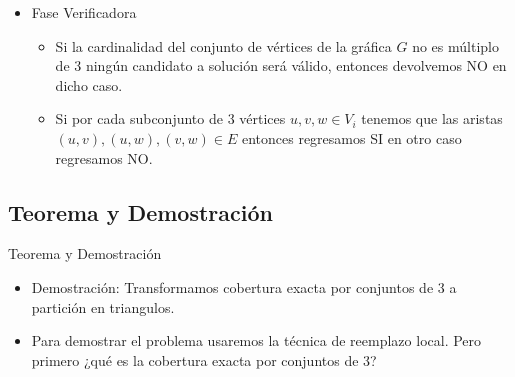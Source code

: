 \begin{frame}{\subsectiontitle}
    \begin{itemize}
    \itemj Fase Adivinadora\\
    \begin{itemize}
        \item Sabemos que $|V| = 3q$ entonces supongamos que tenemos un dado equilibrado de $q$ lados. Para cada $v\in V$ tiramos nuestro dado, sea $n$ el número obtenido por el dado, si el subconjunto de vértices $V_n$ tiene menos de 3 vértices entonces agregamos el vértice $v$ a $V_n$, si el subconjunto de vértices $V_n$ ya tiene 3 vértices entonces buscamos el siguiente $V_m$ que tenga menos de 3 vértices y agregamos $v$ a $V_m$, si llegamos a $V_q$ y no pudimos agregar a $v$ entonces desde $V_n$ buscamos el anterior $V_l$ que tenga menos de 3 vértices y agregamos $v$ a $V_l$, esto lo hacemos hasta recorrer por completo $V$.
    \end{itemize}
    

    \item Fase Verificadora\\

    \begin{itemize}
        \item Si la cardinalidad del conjunto de vértices de la gráfica $G$ no es múltiplo de 3 ningún candidato a solución será válido, entonces devolvemos NO en dicho caso.
        
        \item Si por cada subconjunto de 3 vértices $u,v,w \in V_i$ tenemos que las aristas\\ $(u,v),(u,w),(v,w)\in E$ entonces regresamos SI en otro caso regresamos NO.
    \end{itemize}

    
    
     
    
\end{itemize}
\end{frame}

\renewcommand{\subsectiontitle}{Teorema y Demostración}
\subsection{\subsectiontitle}

\begin{frame}{\subsectiontitle}
    \begin{itemize}
        \itemj Teorema: El problema partición en traingulos es NP-Completo.
        \item Demostración: Transformamos cobertura exacta por conjuntos de 3 a partición en triangulos.
        \item Para demostrar el problema usaremos la técnica de reemplazo local. Pero primero ¿qué es la cobertura exacta por conjuntos de 3?
    \end{itemize}
\end{frame}

